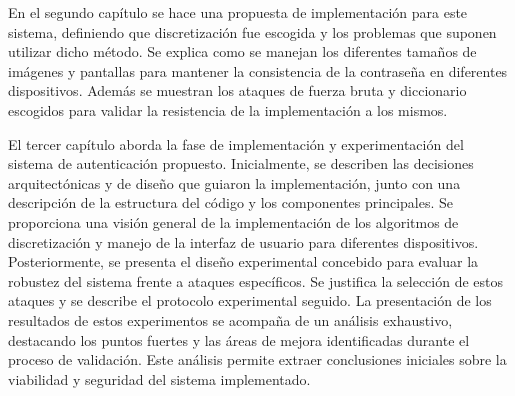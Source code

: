 En el segundo capítulo se hace una propuesta de implementación para este sistema, definiendo que discretización fue escogida y los problemas que suponen utilizar dicho método. Se explica como se manejan los diferentes tamaños de imágenes y pantallas para mantener la consistencia de la contraseña en diferentes dispositivos. Además se muestran los ataques de fuerza bruta y diccionario escogidos para validar la resistencia de la implementación a los mismos.

El tercer capítulo aborda la fase de implementación y experimentación del sistema de autenticación propuesto. Inicialmente, se describen las decisiones arquitectónicas y de diseño que guiaron la implementación, junto con una descripción de la estructura del código y los componentes principales. Se proporciona una visión general de la implementación de los algoritmos de discretización y manejo de la interfaz de usuario para diferentes dispositivos. Posteriormente, se presenta el diseño experimental concebido para evaluar la robustez del sistema frente a ataques específicos. Se justifica la selección de estos ataques y se describe el protocolo experimental seguido. La presentación de los resultados de estos experimentos se acompaña de un análisis exhaustivo, destacando los puntos fuertes y las áreas de mejora identificadas durante el proceso de validación. Este análisis permite extraer conclusiones iniciales sobre la viabilidad y seguridad del sistema implementado.